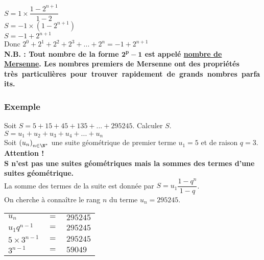$S = 1 \times \dfrac{1 - 2^{n+1}}{1-2}$ \\

$ S = -1 \times \left(1 - 2^{n+1}\right)$ \\

$ S = -1 + 2^{n+1}$ \\

Donc $2^0 + 2^1 + 2^2 + 2^3 + ... + 2^n = -1 + 2^{n+1}$ \\

\textbf{N.B. : Tout nombre de la forme $\mathbf{2^p - 1}$ est appelé \underline{nombre de Mersenne}. Les nombres premiers de Mersenne ont des propriétés \hbox{très particulières pour trouver rapidement de grands nombres parfaits}. }

\subsubsection{Exemple }

Soit $S = 5 + 15 + 45 + 135 + ... + 295 245$. Calculer $S$. \\

$ S = u_1 + u_2 + u_3 + u_4 + ... + u_n$ \\

Soit $\left(u_n\right)_{n \in \N^*}$ une suite géométrique de premier terme $u_1 = 5$ et de raison $q = 3$. \\

\textbf{Attention !}  \\

\textbf{$\mathbf{S}$ n'est pas une suites géométriques mais la sommes des termes d'une suites géométrique.} \\

La somme des termes de la suite est donnée par $S = u_1\dfrac{1 - q^n}{1 - q}$. \\

On cherche à connaître le rang $n$ du terme $u_n = 295 245 $. \\

\begin{tabular}{lll}
$u_n$ & $=$ & $295 245$ \\
$u_1q^{n-1}$& $=$ & $295 245$ \\
$5 \times 3^{n-1}$ & $=$ & $295 245$ \\
$3^{n-1}$& $=$ & $59049$ \\
\end{tabular}

\vspace*{.3cm}

